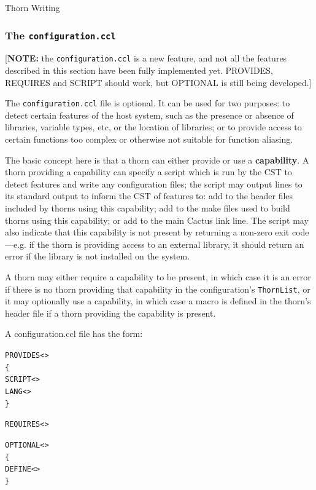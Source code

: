 \begin{cactuspart}{Thorn Writing}

\subsubsection{The \texttt{configuration.ccl}}
\label{subsec:configuration_ccl}

[{\bf NOTE:} the \texttt{configuration.ccl} is a new feature, and not all the
features described in this section have been fully implemented yet.
PROVIDES, REQUIRES and SCRIPT should work, but OPTIONAL is still
being developed.]

The \texttt{configuration.ccl} file is optional.  It can be used for two
purposes: to detect certain features of the host system, such as the
presence or absence of libraries, variable types, etc, or the
location of libraries; or to provide access to certain functions too
complex or otherwise not suitable for function aliasing.

The basic concept here is that a thorn can either provide or use a
{\bf capability}.  A thorn providing a capability can specify a script
which is run by the CST to detect features and write any configuration
files;  the script may output lines to its standard output to inform
the CST of features to: add to the header files included by thorns
using this capability; add to the make files used to build thorns
using this capability; or add to the main Cactus link line.  The script
may also indicate that this capability is not present by returning a
non-zero exit code---e.g. if the thorn is providing access to an
external library, it should return an error if the library is not
installed on the system.

A thorn may either require a capability to be present, in which case
it is an error if there is no thorn providing that capability in the
configuration's \texttt{ThornList}, or it may optionally use a capability, in
which case a macro is defined in the thorn's header file if a thorn
providing the capability is present.

A configuration.ccl file has the form:

\begin{alltt}
PROVIDES <>
\{
  SCRIPT <>
  LANG <>
\}

REQUIRES  <>

OPTIONAL <>
\{
  DEFINE <>
\}


\end{alltt}
\end{cactuspart}
